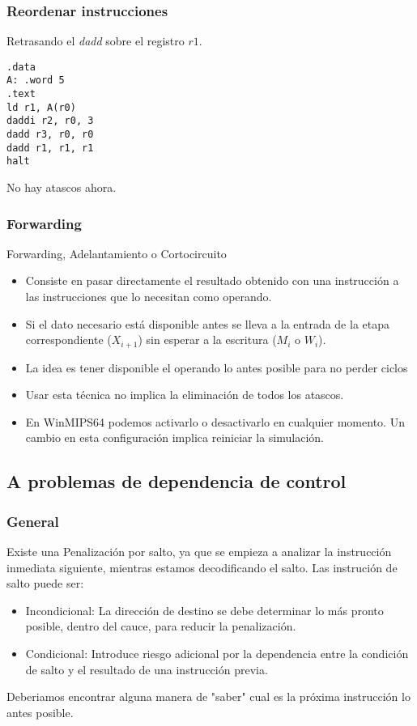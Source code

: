 \documentclass{beamer}
\begin{document}
\begin{frame}[fragile]
\frametitle{Reordenar instrucciones}
Retrasando el \emph{dadd} sobre el registro $r1$.
\begin{block}{}
\begin{lstlisting}[language=WinMIPS64,basicstyle=\ttfamily,keywordstyle=\color{blue}]
.data
A: .word 5
.text
ld r1, A(r0)
daddi r2, r0, 3
dadd r3, r0, r0
dadd r1, r1, r1
halt
\end{lstlisting}
\end{block}
No hay atascos ahora.
\end{frame}



\begin{frame}[fragile]
\frametitle{Forwarding}
Forwarding, Adelantamiento o Cortocircuito
\begin{itemize}
\item Consiste en pasar directamente el resultado obtenido con una instrucción a las instrucciones que lo necesitan como operando.
\item Si el dato necesario está disponible antes se lleva a la entrada de la etapa correspondiente ($X_{i+1}$) sin esperar a la escritura ($M_{i}$ o $W_{i}$).
\item La idea es tener disponible el operando lo antes posible para no perder ciclos
\item Usar esta técnica no implica la eliminación de todos los atascos.
\item En WinMIPS64 podemos activarlo o desactivarlo en cualquier momento. Un cambio en esta configuración implica reiniciar la simulación.
\end{itemize}
\end{frame}

\subsection{A problemas de dependencia de control}
\begin{frame}
\frametitle{General}
Existe una Penalización por salto, ya que se empieza a analizar la instrucción inmediata siguiente, mientras estamos decodificando el salto. Las instrución de salto puede ser: 
\begin{itemize}
\item Incondicional: La dirección de destino se debe determinar lo más pronto posible, dentro del cauce, para reducir la penalización.
\item Condicional: Introduce riesgo adicional por la dependencia entre la condición de salto y el resultado de una instrucción previa.
\end{itemize}
Deberiamos encontrar alguna manera de "saber" cual es la próxima instrucción lo antes posible.
\end{frame}
\end{document}
